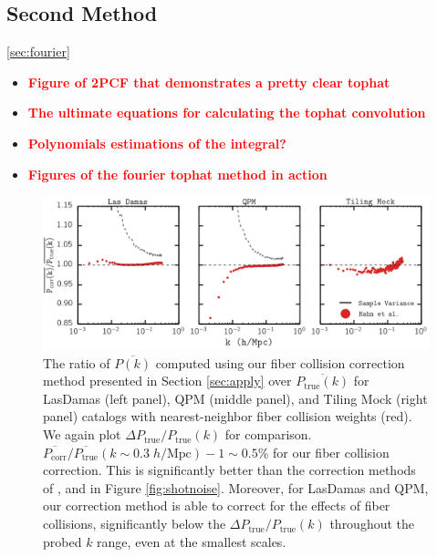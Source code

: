 \documentclass{emulateapj}
\newcommand{\todo}[1]{{\bf \textcolor{red}{ #1}}}
\begin{document}
\subsection{Second Method} \ref{sec:fourier}
\begin{itemize}
\item \todo{Figure of 2PCF that demonstrates a pretty clear tophat} 
\item \todo{The ultimate equations for calculating the tophat convolution}
\item \todo{Polynomials estimations of the integral?}
\item \todo{Figures of the fourier tophat method in action}
\end{itemize}

\begin{figure}
\begin{center}
\includegraphics[scale=0.55]{fcpaper_pk_peakshotnoise_mpfit_comp.png} 
\caption{The ratio of $\overline{P(k)}$ computed using our fiber collision correction method presented in Section \ref{sec:apply} over $\overline{P_\mathrm{true}(k)}$ for LasDamas (left panel), QPM (middle panel), and Tiling Mock (right panel) catalogs with nearest-neighbor fiber collision weights (red). We again plot $\Delta P_\mathrm{true}/P_\mathrm{true}(k)$ for comparison. $\overline{P_\mathrm{corr}}/\overline{P_\mathrm{true}}(k \sim 0.3 \; h/\mathrm{Mpc})-1 \sim 0.5\%$ for our fiber collision correction. This is significantly better than the correction methods of \cite{Anderson:2012aa}, \cite{Beutler:2014aa} and \cite{Gil-Marin:2014aa} in Figure \ref{fig:shotnoise}. Moreover, for LasDamas and QPM, our correction method is able to correct for the effects of fiber collisions, significantly below the $\Delta P_\mathrm{true}/P_\mathrm{true}(k)$ throughout the probed $k$ range, even at the smallest scales. }\label{fig:peaksn}
\end{center}
\end{figure}
\end{document}
